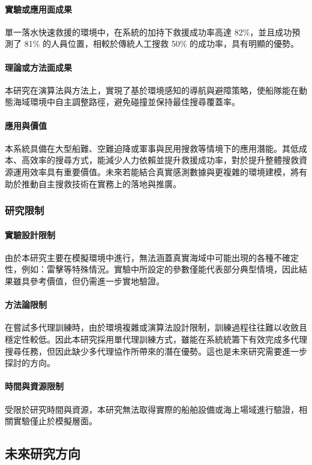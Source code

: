 \documentclass[12pt,a4paper]{article}
\begin{document}
\paragraph{實驗或應用面成果} 單一落水快速救援的環境中，在系統的加持下救援成功率高達 82\%，並且成功預測了 81\% 的人員位置，相較於傳統人工搜救 50\% 的成功率，具有明顯的優勢。

\paragraph{理論或方法面成果} 本研究在演算法與方法上，實現了基於環境感知的導航與避障策略，使船隊能在動態海域環境中自主調整路徑，避免碰撞並保持最佳搜尋覆蓋率。

\paragraph{應用與價值} 本系統具備在大型船難、空難迫降或軍事與民用搜救等情境下的應用潛能。其低成本、高效率的搜尋方式，能減少人力依賴並提升救援成功率，對於提升整體搜救資源運用效率具有重要價值。未來若能結合真實感測數據與更複雜的環境建模，將有助於推動自主搜救技術在實務上的落地與推廣。

\subsubsection{研究限制}
\paragraph{實驗設計限制} 由於本研究主要在模擬環境中進行，無法涵蓋真實海域中可能出現的各種不確定性，例如：雷擊等特殊情況。實驗中所設定的參數僅能代表部分典型情境，因此結果雖具參考價值，但仍需進一步實地驗證。  

\paragraph{方法論限制} 在嘗試多代理訓練時，由於環境複雜或演算法設計限制，訓練過程往往難以收斂且穩定性較低。因此本研究採用單代理訓練方式，雖能在系統統籌下有效完成多代理搜尋任務，但因此缺少多代理協作所帶來的潛在優勢。這也是未來研究需要進一步探討的方向。


\paragraph{時間與資源限制}  受限於研究時間與資源，本研究無法取得實際的船舶設備或海上場域進行驗證，相關實驗僅止於模擬層面。

\subsection{未來研究方向}
\end{document}
